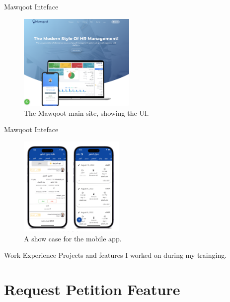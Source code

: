 \documentclass{loyola-beamer}
\begin{document}
\begin{frame}{Mawqoot Inteface}
	\begin{figure}
		\begin{center}
			\includegraphics[width=0.5\textwidth]{figures/site.png}
		\end{center}
		\caption{The Mawqoot main site, showing the UI.}
	\end{figure}
\end{frame}

\begin{frame}{Mawqoot Inteface}
	\begin{figure}
		\begin{center}
			\includegraphics[width=0.45\textwidth]{figures/mobile.png}
		\end{center}
		\caption{A show case for the mobile app.}
	\end{figure}
\end{frame}



\begin{titleframe}{Work Experience}
	Projects and features I worked on during my trainging.
\end{titleframe}

\section{Request Petition Feature}
\end{document}
